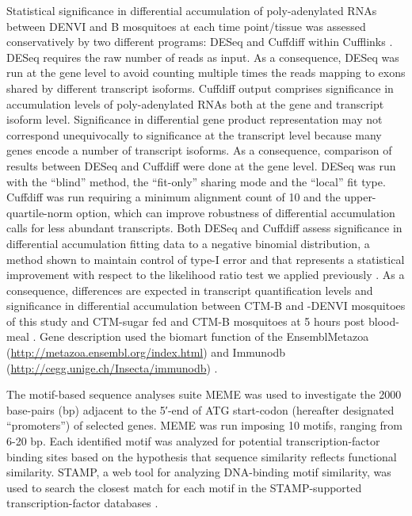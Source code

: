 Statistical significance in differential accumulation of poly-adenylated RNAs between DENVI and B mosquitoes at each time point/tissue was assessed conservatively by two different programs: DESeq and Cuffdiff within Cufflinks \cite{Anders2010,Trapnell2010}. DESeq requires the raw number of reads as input. As a consequence, DESeq was run at the gene level to avoid counting multiple times the reads mapping to exons shared by different transcript isoforms. Cuffdiff output comprises significance in accumulation levels of poly-adenylated RNAs both at the gene and transcript isoform level. Significance in differential gene product representation may not correspond unequivocally to significance at the transcript level because many genes encode a number of transcript isoforms. As a consequence, comparison of results between DESeq and Cuffdiff were done at the gene level. DESeq was run with the “blind” method, the “fit-only” sharing mode and the “local” fit type. Cuffdiff was run requiring a minimum alignment count of 10 and the upper-quartile-norm option, which can improve robustness of differential accumulation calls for less abundant transcripts. Both DESeq and Cuffdiff assess significance in differential accumulation fitting data to a negative binomial distribution, a method shown to maintain control of type-I error and that represents a statistical improvement with respect to the likelihood ratio test we applied previously \cite{bonizzoni2012strain,Anders2010}. As a consequence, differences are expected in transcript quantification levels and significance in differential accumulation between CTM-B and -DENVI mosquitoes of this study and CTM-sugar fed and CTM-B mosquitoes at 5 hours post blood-meal \cite{bonizzoni2012strain}. Gene description used the biomart function of the EnsemblMetazoa (\url{http://metazoa.ensembl.org/index.html}) and Immunodb (\url{http://cegg.unige.ch/Insecta/immunodb}) \cite{Kersey2012,Waterhouse2007}.

The motif-based sequence analyses suite MEME \cite{Bailey1994} was used to investigate the 2000 base-pairs (bp) adjacent to the 5′-end of ATG start-codon (hereafter designated “promoters”) of selected genes. MEME was run imposing 10 motifs, ranging from 6-20 bp. Each identified motif was analyzed for potential transcription-factor binding sites based on the hypothesis that sequence similarity reflects functional similarity. STAMP, a web tool for analyzing DNA-binding motif similarity, was used to search the closest match for each motif in the STAMP-supported transcription-factor databases \cite{Mahony2007stamp}.



